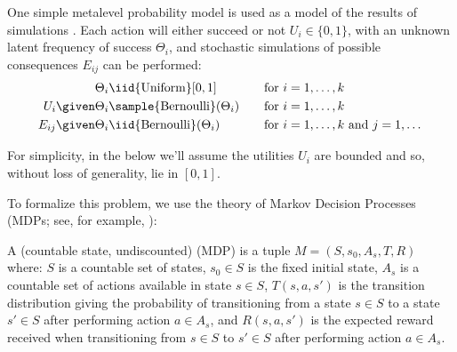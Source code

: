 \begin{example}\label{example:bernoulli}
One simple metalevel probability model is used as a model of the results of simulations \cite{someone}.
Each action will either succeed or not $U_i\in\{0,1\}$, with an unknown latent frequency of success $\Theta_i$, 
and stochastic simulations of possible consequences $E_{ij}$ can be performed:
\begin{align*}
	\Theta_i &\iid {\rm Uniform}[0,1]                      &&\quad\text{for $i=1,\dots,k$}\\
	U_i \given \Theta_i &\sample {\rm Bernoulli}(\Theta_i) &&\quad\text{for $i=1,\dots,k$}\\
	E_{ij} \given \Theta_i &\iid {\rm Bernoulli}(\Theta_i) &&\quad\text{for $i=1,\dots,k$ and $j=1,\dots$}
\end{align*}
\end{example}

For simplicity, in the below we'll assume the utilities $U_i$ are bounded and so, 
without loss of generality, lie in $[0,1]$.

To formalize this problem, we use the theory of Markov Decision Processes (MDPs; 
see, for example, \citet{Puterman:1994}):

\begin{dfn}
A (countable state, undiscounted)  (MDP) is a tuple $M=(S,s_0,A_s,T,R)$ where:
	$S$ is a countable set of states,
	$s_0\in S$ is the fixed initial state,
	$A_s$ is a countable set of actions available in state $s\in S$,
	$T(s,a,s')$ is the transition distribution 
	giving the probability of transitioning from a state $s\in S$ to a state $s'\in S$ after performing action $a\in A_s$,
	and $R(s,a,s')$ is the expected reward received when transitioning from $s\in S$ to $s'\in S$ after performing action $a\in A_s$.
\end{dfn}

